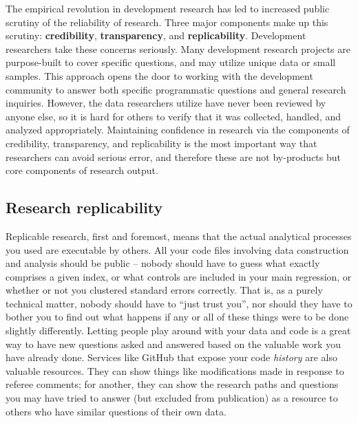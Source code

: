 The empirical revolution in development research
has led to increased public scrutiny of the reliability of research.\cite{rogers_2017}
Three major components make up this scrutiny: \textbf{credibility},\cite{ioannidis2017power} \textbf{transparency},\cite{christensen2018transparency} and \textbf{replicability}.\cite{duvendack2017meant}
Development researchers take these concerns seriously.
Many development research projects are purpose-built to cover specific questions,
and may utilize unique data or small samples.
This approach opens the door to working with the development community
to answer both specific programmatic questions and general research inquiries.
However, the data researchers utilize have never been reviewed by anyone else,
so it is hard for others to verify that it was collected, handled, and analyzed appropriately.
Maintaining confidence in research via the components of credibility, transparency, and replicability
is the most important way that researchers can avoid serious error,
and therefore these are not by-products but core components of research output.

\subsection{Research replicability}

Replicable research, first and foremost,
means that the actual analytical processes you used are executable by others.\cite{dafoe2014science}
All your code files involving data construction and analysis
should be public -- nobody should have to guess what exactly comprises a given index,
or what controls are included in your main regression,
or whether or not you clustered standard errors correctly.
That is, as a purely technical matter, nobody should have to ``just trust you'',
nor should they have to bother you to find out what happens
if any or all of these things were to be done slightly differently.\cite{simmons2011false,wicherts2016degrees}
Letting people play around with your data and code is a great way to have new questions asked and answered
based on the valuable work you have already done.
Services like GitHub that expose your code \textit{history}
are also valuable resources. They can show things like modifications
made in response to referee comments; for another, they can show
the research paths and questions you may have tried to answer
(but excluded from publication)
as a resource to others who have similar questions of their own data.

